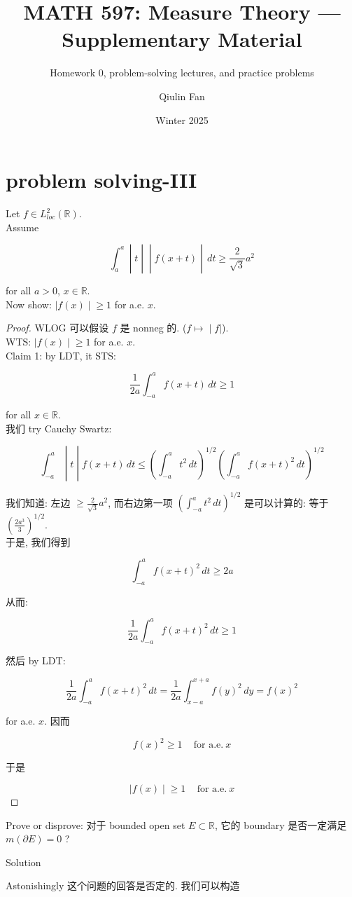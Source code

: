 \documentclass{qlnotes-export}
\title{MATH 597: Measure Theory --- Supplementary Material}
\subtitle{Homework 0, problem-solving lectures, and practice problems}
\author{Qiulin Fan}
\date{Winter 2025}
\begin{document}
\mainmatter
\chapter{problem solving-III}\label{problem-solving-iii}

\begin{example}

Let \(f \in L_{loc}^{2}({\mathbb{R}})\).\\
Assume

\[\left. \int_{a}^{a} \middle| t \middle| \middle| f(x + t) \middle| \, dt \geq \frac{2}{\sqrt{3}}a^{2} \right.\]

for all \(a > 0\), \(x \in {\mathbb{R}}\).\\
Now show: \(\left. |f(x) \middle| \geq 1 \right.\) for a.e. \(x\).\\

\end{example}

\begin{proof}

WLOG 可以假设 \(f\) 是 nonneg 的. (\(\left. f\mapsto \middle| f| \right.\)).\\
WTS: \(\left. |f(x) \middle| \geq 1 \right.\) for a.e. \(x\).\\
Claim 1: by LDT, it STS:

\[\frac{1}{2a}\int_{- a}^{a}f(x + t)\, dt \geq 1\]

for all \(x \in {\mathbb{R}}\).\\
我们 try Cauchy Swartz:

\[\left. \int_{- a}^{a} \middle| t \middle| f(x + t)\, dt \leq (\int_{- a}^{a}t^{2}\, dt)^{1/2}(\int_{- a}^{a}f(x + t)^{2}\, dt)^{1/2} \right.\]

我们知道: 左边 \(\geq \frac{2}{\sqrt{3}}a^{2}\), 而右边第一项 \((\int_{- a}^{a}t^{2}\, dt)^{1/2}\) 是可以计算的: 等于 \((\frac{2a^{3}}{3})^{1/2}\).\\
于是, 我们得到

\[\int_{- a}^{a}f(x + t)^{2}\, dt \geq 2a\]

从而:

\[\frac{1}{2a}\int_{- a}^{a}f(x + t)^{2}\, dt \geq 1\]

然后 by LDT:

\[\frac{1}{2a}\int_{- a}^{a}f(x + t)^{2}\, dt = \frac{1}{2a}\int_{x - a}^{x + a}f(y)^{2}\, dy = f(x)^{2}\]

for a.e. \(x\). 因而

\[f(x)^{2} \geq 1\,\quad\text{for a.e.}\ x\]

于是

\[\left. |f(x) \middle| \geq 1\,\quad\text{for a.e.}\ x \right.\]

\end{proof}

\begin{example}

Prove or disprove: 对于 bounded open set \(E \subset {\mathbb{R}}\), 它的 boundary 是否一定满足 \(m(\partial E) = 0\) ?\\

\end{example}

\begin{qlsolution}{Solution}

Astonishingly 这个问题的回答是否定的. 我们可以构造

\end{qlsolution}
\end{document}

